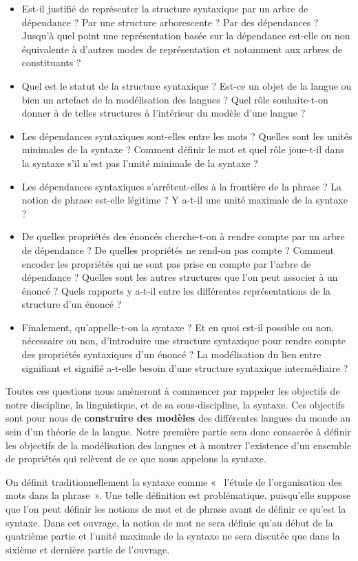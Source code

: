 \begin{itemize}
\item Est-il justifié de représenter la structure syntaxique par un arbre de dépendance ? Par une structure arborescente ? Par des dépendances ? Jusqu’à quel point une représentation basée sur la dépendance est-elle ou non équivalente à d’autres modes de représentation et notamment aux arbres de constituants ?
\item Quel est le statut de la structure syntaxique ? Est-ce un objet de la langue ou bien un artefact de la modélisation des langues ? Quel rôle souhaite-t-on donner à de telles structures à l’intérieur du modèle d’une langue ?
\item Les dépendances syntaxiques sont-elles entre les mots ? Quelles sont les unités minimales de la syntaxe ? Comment définir le mot et quel rôle joue-t-il dans la syntaxe s’il n’est pas l’unité minimale de la syntaxe ?
\item Les dépendances syntaxiques s’arrêtent-elles à la frontière de la phrase ? La notion de phrase est-elle légitime ? Y a-t-il une unité maximale de la syntaxe ?
\item De quelles propriétés des énoncés cherche-t-on à rendre compte par un arbre de dépendance ? De quelles propriétés ne rend-on pas compte ? Comment encoder les propriétés qui ne sont pas prise en compte par l’arbre de dépendance ? Quelles sont les autres structures que l’on peut associer à un énoncé ? Quels rapports y a-t-il entre les différentes représentations de la structure d’un énoncé ?
\item Finalement, qu’appelle-t-on la syntaxe ? Et en quoi est-il possible ou non, nécessaire ou non, d’introduire une structure syntaxique pour rendre compte des propriétés syntaxiques d’un énoncé ? La modélisation du lien entre signifiant et signifié a-t-elle besoin d’une structure syntaxique intermédiaire ?
\end{itemize}

Toutes ces questions nous amèneront à commencer par rappeler les objectifs de notre discipline, la linguistique, et de sa sous-discipline, la syntaxe. Ces objectifs sont pour nous de \textbf{construire des modèles} des différentes langues du monde au sein d’un théorie de la langue. Notre première partie sera donc consacrée à définir les objectifs de la modélisation des langues et à montrer l’existence d’un ensemble de propriétés qui relèvent de ce que nous appelons la syntaxe.

On définit traditionnellement la syntaxe comme «~ l’étude de l’organisation des mots dans la phrase~». Une telle définition est problématique, puisqu’elle suppose que l’on peut définir les notions de mot et de phrase avant de définir ce qu’est la syntaxe. Dans cet ouvrage, la notion de mot ne sera définie qu’au début de la quatrième partie et l’unité maximale de la syntaxe ne sera discutée que dans la sixième et dernière partie de l’ouvrage.

